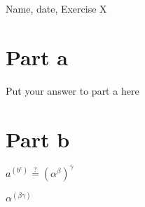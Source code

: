 \documentclass{article}
\begin{document}
Name, date, Exercise X

\section*{Part a}

Put your answer to part a here

\section*{Part b}

$a^{(b^c)} \stackrel{?}{=}{(\alpha^{\beta})}^\gamma$

$\alpha^{(\beta\gamma)}$
\end{document}
